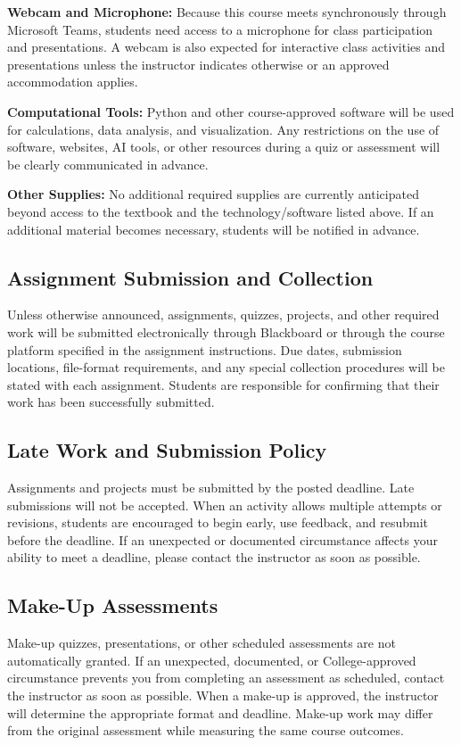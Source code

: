 \documentclass{exam}
\begin{document}
\noindent \textbf{Webcam and Microphone:} Because this course meets synchronously through Microsoft Teams, students need access to a microphone for class participation and presentations. A webcam is also expected for interactive class activities and presentations unless the instructor indicates otherwise or an approved accommodation applies.

\noindent \textbf{Computational Tools:} Python and other course-approved software will be used for calculations, data analysis, and visualization. Any restrictions on the use of software, websites, AI tools, or other resources during a quiz or assessment will be clearly communicated in advance.

\noindent \textbf{Other Supplies:} No additional required supplies are currently anticipated beyond access to the textbook and the technology/software listed above. If an additional material becomes necessary, students will be notified in advance.

\subsection*{Assignment Submission and Collection}
Unless otherwise announced, assignments, quizzes, projects, and other required work will be submitted electronically through Blackboard or through the course platform specified in the assignment instructions. Due dates, submission locations, file-format requirements, and any special collection procedures will be stated with each assignment. Students are responsible for confirming that their work has been successfully submitted.

\subsection*{Late Work and Submission Policy}
Assignments and projects must be submitted by the posted deadline. Late submissions will not be accepted. When an activity allows multiple attempts or revisions, students are encouraged to begin early, use feedback, and resubmit before the deadline. If an unexpected or documented circumstance affects your ability to meet a deadline, please contact the instructor as soon as possible.

\subsection*{Make-Up Assessments}
Make-up quizzes, presentations, or other scheduled assessments are not automatically granted. If an unexpected, documented, or College-approved circumstance prevents you from completing an assessment as scheduled, contact the instructor as soon as possible. When a make-up is approved, the instructor will determine the appropriate format and deadline. Make-up work may differ from the original assessment while measuring the same course outcomes.
\end{document}
